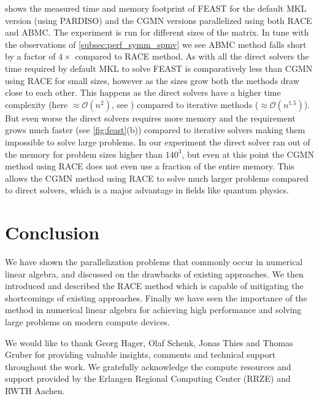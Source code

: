  shows the measured time and memory footprint of FEAST for 
the default MKL version (using PARDISO) and the CGMN versions
 parallelized using both \acrshort{RACE} and \acrshort{ABMC}.
The experiment is run for different sizes of the matrix. In tune
with the observations of \cref{subsec:perf_symm_spmv} we see \acrshort{ABMC}
method falls short by a factor of $4\times$ compared to \acrshort{RACE} method.
As with all the direct solvers the time required by default MKL to solve FEAST
is comparatively less than CGMN using \acrshort{RACE} for small sizes, however as the 
sizes grow both the methods draw close to each other. This happens as the 
direct solvers have a higher time complexity (here $\approx \mathcal{O}(n^{2})$, 
see ) compared to iterative methods ($\approx \mathcal{O}(n^{1.5})$).
But even worse the direct solvers requires more memory and the 
requirement grows much faster (see \cref{fig:feast}(b)) compared to 
iterative solvers making them impossible to solve large problems. 
In our experiment the direct solver ran out of the memory for problem sizes
higher than $140^3$, but even at this point the CGMN method using
\acrshort{RACE} does not even use a fraction of the entire memory. 
This allows the CGMN method using \acrshort{RACE} to solve much larger 
problems compared to direct solvers, which is a major advantage 
in fields like quantum physics.

\section*{Conclusion}
We have shown the parallelization problems that commonly occur in numerical 
linear algebra, and discussed on the drawbacks of existing approaches.
We  then introduced and described the \acrshort{RACE} method  which 
is capable of mitigating the shortcomings of existing approaches.
Finally we have seen the importance of the method in numerical 
linear algebra for achieving high performance and solving large 
problems on modern compute devices.



\begin{acks}
We would like to thank Georg Hager, Olaf Schenk, Jonas Thies and Thomas Gruber
 for providing valuable insights, comments and technical support throughout the 
 work.  We gratefully acknowledge the compute resources and support provided by
 the Erlangen Regional Computing Center (RRZE) and RWTH Aachen.
\end{acks}


